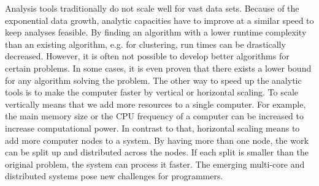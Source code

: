 Analysis tools traditionally do not scale well for vast data sets.
Because of the exponential data growth, analytic capacities have to improve at a similar speed to keep analyses feasible. 
By finding an algorithm with a lower runtime complexity than an existing algorithm, e.g. for clustering, run times can be drastically decreased. 
However, it is often not possible to develop better algorithms for certain problems. In some cases, it is even proven that there exists a lower bound for any algorithm solving the problem.
The other way to speed up the analytic tools is to make the computer faster by vertical or horizontal scaling. To scale vertically means that we add more resources to a single computer.
For example, the main memory size or the CPU frequency of a computer can be increased to increase computational power.
In contrast to that, horizontal scaling means to add more computer nodes to a system.
By having more than one node, the work can be split up and distributed across the nodes.
If each split is smaller than the original problem, the system can process it faster. %
The emerging multi-core and distributed systems pose new challenges for programmers.%

